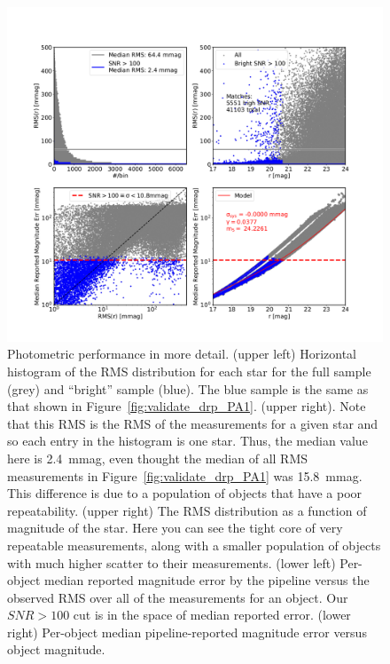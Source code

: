 \documentclass[twocolumn]{aastex62}
\begin{document}
\begin{figure}
\centering
\includegraphics[width=1.8\columnwidth]{DC1-imsim-dithered_r_check_photometry.png}
\caption{Photometric performance in more detail.  (upper left) Horizontal histogram of the RMS distribution for each star for the full sample (grey) and ``bright'' sample (blue).  The blue sample is the same as that shown in Figure~\ref{fig:validate_drp_PA1}. (upper right).  Note that this RMS is the RMS of the measurements for a given star and so each entry in the histogram is one star. Thus, the median value here is 2.4~mmag, even thought the median of all RMS measurements in Figure~\ref{fig:validate_drp_PA1} was 15.8~mmag.  This difference is due to a population of objects that have a poor repeatability. (upper right) The RMS distribution as a function of magnitude of the star.  Here you can see the tight core of very repeatable measurements, along with a smaller population of objects with much higher scatter to their measurements. (lower left) Per-object median reported magnitude error by the pipeline versus the observed RMS over all of the measurements for an object.  Our $SNR>100$ cut is in the space of median reported error. (lower right) Per-object median pipeline-reported magnitude error versus object magnitude. 
}
\label{fig:validate_drp_check_photometry}
\end{figure}
\end{document}
